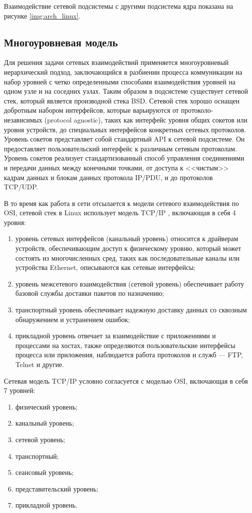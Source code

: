 Взаимодействие сетевой подсистемы с другими подсистема ядра показана на рисунке \ref{img:arch_linux}.

\subsection{Многоуровневая модель}

Для решения задачи сетевых взаимодействий применяется многоуровневый иерархический подход, заключающийся в разбиении процесса коммуникации на набор уровней с четко определенными способами взаимодействия уровней на одном узле и на соседних узлах. 
Таким образом в подсистеме существует сетевой стек, который является производной стека BSD.
Сетевой стек хорошо оснащен добротным набором интерфейсов, которые варьируются от протоколо-независимых (protocol agnostic), таких как интерфейс уровня общих сокетов или уровня устройств, до специальных интерфейсов конкретных сетевых протоколов. 
Уровень сокетов представляет собой стандартный API к сетевой подсистеме. 
Он предоставляет пользовательский интерфейс к различным сетевым протоколам. 
Уровень сокетов реализует стандартизованный способ управления соединениями и передачи данных между конечными точками, от доступа к <<чистым>> кадрам данных и блокам данных протокола IP/PDU, и до протоколов TCP/UDP.

В то время как работа в сети отсылается к модели сетевого взаимодействия по OSI, сетевой стек в Linux использует модель TCP/IP \cite{tcpip_craig, tcpip_lora}, включающая в себя 4 уровня:
\begin{enumerate}
	\item уровень сетевых интерфейсов (канальный уровень) относится к драйверам устройств, обеспечивающим доступ к физическому уровню, который может состоять из многочисленных сред, таких как последовательные каналы или устройства Ethernet, описываются как сетевые интерфейсы;
	\item уровень межсетевого взаимодействия (сетевой уровень) обеспечивает работу базовой
	службы доставки пакетов по назначению;
	\item транспортный уровень обеспечивает надежную доставку данных со сквозным обнаружением и устранением ошибок;
	\item прикладной уровень отвечает за взаимодействие с приложениями и процессами на хостах, также определяются пользовательские интерфейсы процесса или приложения, наблюдается работа протоколов и служб --- FTP, Telnet и другие. 
\end{enumerate}
Сетевая модель TCP/IP условно согласуется с моделью OSI, включающая в себя 7 уровней:
\begin{enumerate}
	\item физический уровень;
	\item канальный уровень;
	\item сетевой уровень;
	\item транспортный;
	\item сеансовый уровень;
	\item представительский уровень;
	\item прикладной уровень.
\end{enumerate}

